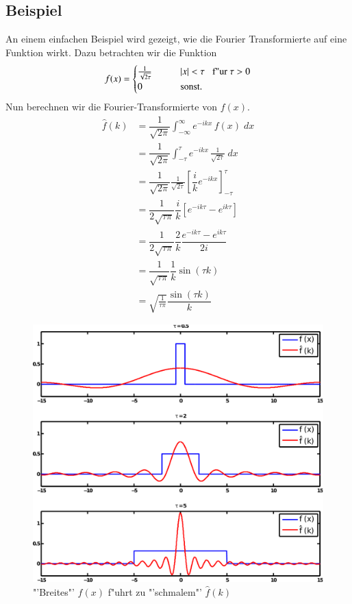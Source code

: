 \begin{refsection}
\subsection{Beispiel}

An einem einfachen Beispiel wird gezeigt, wie die Fourier Transformierte auf eine Funktion wirkt. Dazu betrachten wir die Funktion
\begin{equation}
f(x)=\begin{cases}
    \frac{1}{\sqrt{2\tau}}       & \qquad |x|< \tau \;\;\; \textnormal{f"ur }  \tau > 0\\
    0  & \qquad\text{sonst.}\\
  \end{cases}
\end{equation}
Nun berechnen wir die Fourier-Transformierte von $f(x)$.
\begin{align}
\hat{f}(k)
&=\dfrac{1}{\sqrt{2\pi}}\int_{-\infty}^{\infty}e^{-i k x} \, f(x) \; dx\\
&=\dfrac{1}{\sqrt{2\pi}}\int_{-\tau}^{\tau}e^{-i k x} \, \frac{1}{\sqrt{2\tau}} \; dx\\
&=\dfrac{1}{\sqrt{2\pi}}\frac{1}{\sqrt{2\tau}}\left[ \dfrac{i}{k}e^{-ik x}\right]_{-\tau}^{\tau}\\
&=\dfrac{1}{2\sqrt{\tau\pi}}\dfrac{i}{k}\left[e^{-ik \tau} - e^{ik \tau}\right]\\
&=\dfrac{1}{2\sqrt{\tau\pi}}\dfrac{2}{k}\dfrac{e^{-ik \tau} - e^{ik \tau}}{2i}\\
&=\dfrac{1}{\sqrt{\tau\pi}}\dfrac{1}{k}\sin(\tau k)\\
&=\sqrt{\frac{1}{\tau\pi}}\dfrac{\sin(\tau k)}{k}
\end{align}
\begin{figure}
 \centering
 \includegraphics[width=12cm]{heisenberg/fourier_unschaerfeprinzip.pdf}
 \caption{"'Breites"' $f(x)$ f"uhrt zu "'schmalem"' $\hat{f}(k)$}
 \label{abb:unschaerfeprinzip}
\end{figure}


\end{refsection}
